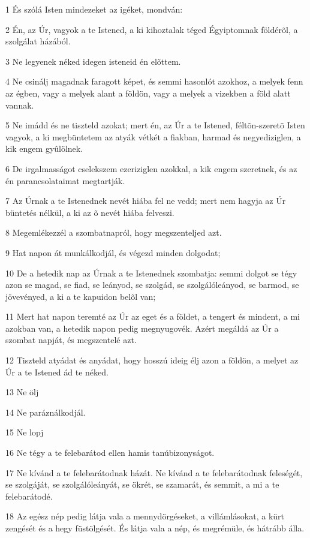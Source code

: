 \par 1 És szólá Isten mindezeket az igéket, mondván:
\par 2 Én, az Úr, vagyok a te Istened, a ki kihoztalak téged Égyiptomnak földérõl, a szolgálat házából.
\par 3 Ne legyenek néked idegen isteneid én elõttem.
\par 4 Ne csinálj magadnak faragott képet, és semmi hasonlót azokhoz, a melyek fenn az égben, vagy a melyek alant a földön, vagy a melyek a vizekben a föld alatt vannak.
\par 5 Ne imádd és ne tiszteld azokat; mert én, az Úr a te Istened, féltõn-szeretõ Isten vagyok, a ki megbüntetem az atyák vétkét a fiakban, harmad és negyediziglen, a kik engem gyûlölnek.
\par 6 De irgalmasságot cselekszem ezeriziglen azokkal, a kik engem szeretnek, és az én parancsolataimat megtartják.
\par 7 Az Úrnak a te Istenednek nevét hiába fel ne vedd; mert nem hagyja az Úr büntetés nélkül, a ki az õ nevét hiába felveszi.
\par 8 Megemlékezzél a szombatnapról, hogy megszenteljed azt.
\par 9 Hat napon át munkálkodjál, és végezd minden dolgodat;
\par 10 De a hetedik nap az Úrnak a te Istenednek szombatja: semmi dolgot se tégy azon se magad, se fiad, se leányod, se szolgád, se szolgálóleányod, se barmod, se jövevényed, a ki a te kapuidon belõl van;
\par 11 Mert hat napon teremté az Úr az eget és a földet, a tengert és mindent, a mi azokban van, a hetedik napon pedig megnyugovék. Azért megáldá az Úr a szombat napját, és megszentelé azt.
\par 12 Tiszteld atyádat és anyádat, hogy hosszú ideig élj azon a földön, a melyet az Úr a te Istened ád te néked.
\par 13 Ne ölj
\par 14 Ne paráználkodjál.
\par 15 Ne lopj
\par 16 Ne tégy a te felebarátod ellen hamis tanúbizonyságot.
\par 17 Ne kívánd a te  felebarátodnak házát. Ne kívánd a te felebarátodnak feleségét, se szolgáját, se szolgálóleányát, se ökrét, se szamarát, és semmit, a mi a te felebarátodé.
\par 18 Az egész nép pedig látja vala a mennydörgéseket, a villámlásokat, a kürt zengését és a hegy füstölgését. És látja vala a nép, és megrémüle, és hátrább álla.
